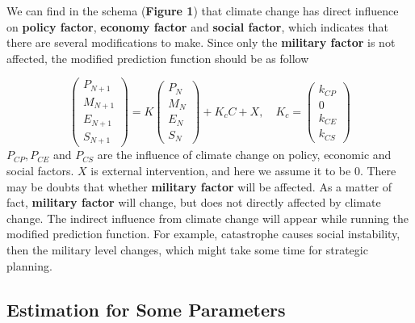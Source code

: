 \documentclass{mcmthesis}
\begin{document}
	We can find in the schema (\textbf{Figure 1}) that climate change has direct influence on \textbf{policy factor}, \textbf{economy factor} and \textbf{social factor}, which indicates that there are several modifications to make. Since only the \textbf{military factor} is not affected, the modified prediction function should be as follow
	
	$$
	\left(
	\begin{matrix}
	P_{N+1} \\ M_{N+1} \\ E_{N+1} \\ S_{N+1}
	\end{matrix}
	\right) 
	= 
	K 
	\left(
	\begin{matrix}
	P_N \\ M_N \\ E_N \\ S_N
	\end{matrix}
	\right) 
	+
	K_c
	C
	+ X
	, \quad
	K_c = 
	\left(
	\begin{matrix}
	k_{CP} \\ {0} \\ k_{CE} \\ k_{CS}
	\end{matrix}
	\right)
	$$
	$P_{CP},P_{CE}$ and $P_{CS}$ are the influence of climate change on policy, economic and social factors. $X$ is external intervention, and here we assume it to be 0. There may be doubts that whether \textbf{military factor} will be affected. As a matter of fact, \textbf{military factor} will change, but does not directly affected by climate change. The indirect influence from climate change will appear while running the modified prediction function. For example, catastrophe causes social instability, then the military level changes, which might take some time for strategic planning.
	
	
	\subsection{Estimation for Some Parameters}
	
\end{document}

